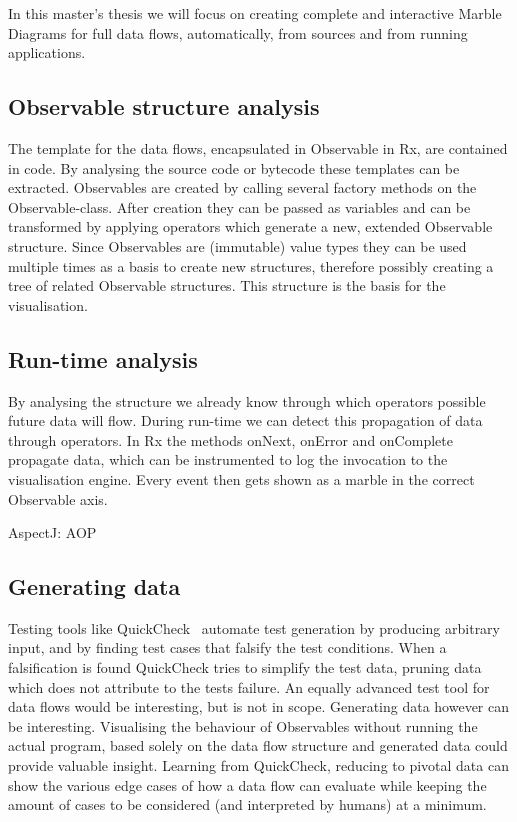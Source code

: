 \documentclass[11pt,a4paper]{article}
\begin{document}
In this master's thesis we will focus on creating complete and interactive Marble Diagrams for full data flows, automatically, from sources and from running applications.

\subsection{Observable structure analysis}
The template for the data flows, encapsulated in Observable in Rx, are contained in code. By analysing the source code or bytecode these templates can be extracted. Observables are created by calling several factory methods on the Observable-class. After creation they can be passed as variables and can be transformed by applying operators which generate a new, extended Observable structure. Since Observables are (immutable) value types they can be used multiple times as a basis to create new structures, therefore possibly creating a tree of related Observable structures. This structure is the basis for the visualisation.

\subsection{Run-time analysis}
By analysing the structure we already know through which operators possible future data will flow. During run-time we can detect this propagation of data through operators. In Rx the methods onNext, onError and onComplete propagate data, which can be instrumented to log the invocation to the visualisation engine. Every event then gets shown as a marble in the correct Observable axis.

AspectJ: AOP

\subsection{Generating data}
Testing tools like QuickCheck~\cite{quickcheck} automate test generation by producing arbitrary input, and by finding test cases that falsify the test conditions. When a falsification is found QuickCheck tries to simplify the test data, pruning data which does not attribute to the tests failure. An equally advanced test tool for data flows would be interesting, but is not in scope. Generating data however can be interesting. Visualising the behaviour of Observables without running the actual program, based solely on the data flow structure and generated data could provide valuable insight. Learning from QuickCheck, reducing to pivotal data can show the various edge cases of how a data flow can evaluate while keeping the amount of cases to be considered (and interpreted by humans) at a minimum.
\end{document}
